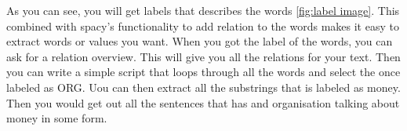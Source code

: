 As you can see, you will get labels that describes the words \ref{fig:label image}.
This combined with spacy's functionality to add relation to the words makes it easy to extract words or values you want.
When you got the label of the words, you can ask for a relation overview.
This will give you all the relations for your text.
Then you can write a simple script that loops through all the words and select the once labeled as ORG. Uou can then extract all the substrings that is labeled as money.
Then you would get out all the sentences that has and organisation talking about money in some form. 







